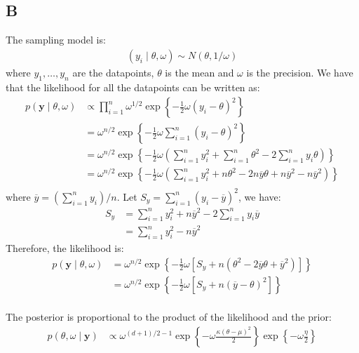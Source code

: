 \documentclass{article}
\begin{document}
\subsection*{B}
The sampling model is:
\begin{align*}
(y_i\mid \theta, \omega) \sim N(\theta, 1/\omega)
\end{align*}
where \(y_1, \dots, y_n\) are the datapoints, \(\theta\) is the mean and \(\omega\) is the precision. We have that the likelihood for all the datapoints can be written as:
\begin{align*}
p(\mathbf{y} \mid \theta, \omega) &\propto \prod_{i=1}^n \omega^{1/2} \exp \left\lbrace -\frac{1}{2}\omega (y_i - \theta)^2 \right\rbrace\\
&= \omega^{n/2} \exp \left\lbrace -\frac{1}{2}\omega \sum_{i=1}^n (y_i - \theta)^2 \right\rbrace\\ 
&= \omega^{n/2} \exp \left\lbrace -\frac{1}{2}\omega \left( \sum_{i=1}^n y_i^2 + \sum_{i=1}^n\theta^2 - 2\sum_{i=1}^n y_i\theta\right) \right\rbrace\\ 
&= \omega^{n/2} \exp \left\lbrace -\frac{1}{2}\omega \left( \sum_{i=1}^n y_i^2 + n\theta^2 - 2n\overline{y}\theta + n\overline{y}^2 - n\overline{y}^2 \right) \right\rbrace\\ 
\end{align*}
where \(\overline{y} = \left(\sum_{i=1}^n y_i\right)/n\). Let \(S_y = \sum_{i=1}^n (y_i - \overline{y})^2\), we have:
\begin{align*}
S_y &= \sum_{i=1}^n y_i^2 + n \overline{y}^2 - 2 \sum_{i=1}^n y_i \overline{y}\\
&= \sum_{i=1}^n y_i^2 - n\overline{y}^2
\end{align*}
Therefore, the likelihood is:
\begin{align*}
p(\mathbf{y} \mid \theta, \omega) &= \omega^{n/2} \exp \left\lbrace -\frac{1}{2}\omega \left[ S_y + n(\theta^2 - 2\overline{y}\theta + \overline{y}^2) \right] \right\rbrace\\ 
&= \omega^{n/2} \exp \left\lbrace -\frac{1}{2}\omega \left[ S_y +  n (\overline{y} - \theta)^2\right] \right\rbrace\\ 
\end{align*}

The posterior is proportional to the product of the likelihood and the prior:
\begin{align*}
p(\theta, \omega \mid \mathbf{y}) &\propto \omega^{(d+1)/2 - 1} \exp\left\lbrace - \omega \frac{\kappa(\theta-\mu)^2}{2} \right\rbrace \exp\left\lbrace -\omega \frac{\eta}{2}\right\rbrace
\end{align*}
\end{document}
